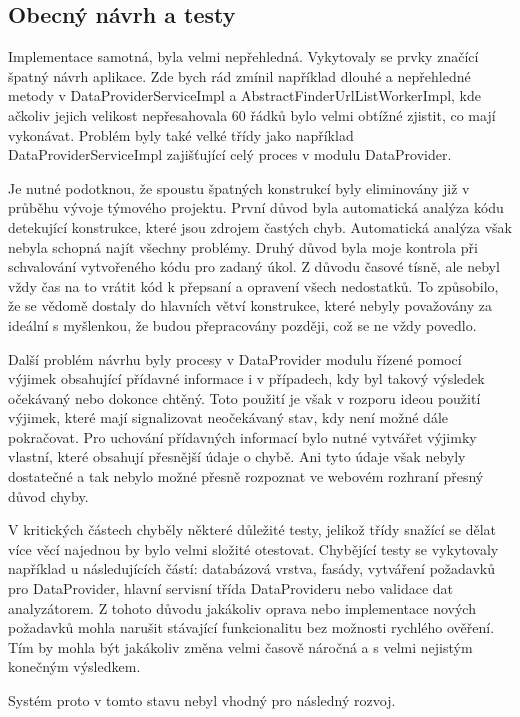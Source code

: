 \documentclass[thesis=B,czech]{FITthesis}[2012/06/26]
\begin{document}
\subsection{Obecný návrh a testy}
Implementace samotná, byla velmi nepřehledná. Vykytovaly se prvky značící špatný návrh aplikace.
Zde bych rád zmínil například dlouhé a nepřehledné metody v
DataProviderServiceImpl a AbstractFinderUrlListWorkerImpl, kde ačkoliv jejich velikost 
nepřesahovala 60 řádků bylo velmi obtížné zjistit, co mají vykonávat. Problém byly také velké třídy
jako například DataProviderServiceImpl zajišťující celý proces v modulu DataProvider.
\par
Je nutné podotknou, že spoustu špatných konstrukcí byly eliminovány již v průběhu vývoje týmového projektu.
První důvod byla automatická analýza kódu detekující konstrukce, které jsou zdrojem častých chyb. Automatická analýza
však nebyla schopná najít všechny problémy. Druhý důvod byla moje kontrola při schvalování vytvořeného kódu pro 
zadaný úkol. Z důvodu časové tísně, ale nebyl vždy čas na to vrátit kód k přepsaní a opravení všech nedostatků. To způsobilo, že
se vědomě dostaly do hlavních větví konstrukce, které nebyly považovány za ideální s myšlenkou, že budou přepracovány později, což se ne vždy povedlo.
\par
Další problém návrhu byly procesy v DataProvider modulu řízené pomocí výjimek obsahující 
přídavné informace i v případech, kdy byl takový výsledek očekávaný nebo dokonce chtěný. 
Toto použití je však v rozporu ideou použití výjimek, které mají signalizovat neočekávaný stav, kdy není možné dále pokračovat.\cite{exception}
Pro uchování přídavných informací bylo nutné vytvářet výjimky vlastní, které obsahují přesnější údaje o chybě. Ani tyto údaje však nebyly 
dostatečné a tak nebylo možné přesně rozpoznat ve webovém rozhraní přesný důvod chyby.
\par
V kritických částech chyběly některé důležité testy, jelikož třídy snažící se dělat více věcí najednou by bylo velmi
složité otestovat. Chybějící testy se vykytovaly například u následujících částí: databázová vrstva, fasády, vytváření požadavků pro DataProvider,
hlavní servisní třída DataProvideru nebo validace dat analyzátorem. Z tohoto důvodu jakákoliv oprava nebo implementace nových požadavků 
mohla narušit stávající funkcionalitu bez možnosti rychlého ověření. Tím by mohla být jakákoliv změna velmi časově náročná a s velmi nejistým konečným výsledkem.

Systém proto v tomto stavu nebyl vhodný pro následný rozvoj.
\end{document}
